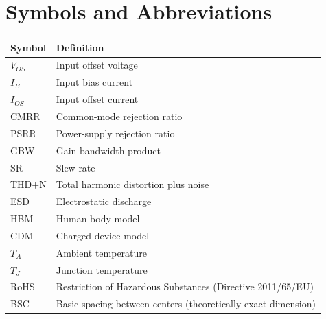 \section{Symbols and Abbreviations}
\begin{center}
\begin{tabular}{@{}L{2.4cm}L{13.0cm}@{}}
\toprule
{}
{\footnotesize\bfseries Symbol} & {\footnotesize\bfseries Definition} \\
\midrule
$V_{OS}$  & Input offset voltage \\
$I_B$     & Input bias current \\
$I_{OS}$  & Input offset current \\
CMRR      & Common-mode rejection ratio \\
PSRR      & Power-supply rejection ratio \\
GBW       & Gain-bandwidth product \\
SR        & Slew rate \\
THD$+$N   & Total harmonic distortion plus noise \\
ESD       & Electrostatic discharge \\
HBM       & Human body model \\
CDM       & Charged device model \\
$T_A$     & Ambient temperature \\
$T_J$     & Junction temperature \\
RoHS      & Restriction of Hazardous Substances (Directive 2011/65/EU) \\
BSC       & Basic spacing between centers (theoretically exact dimension) \\
\bottomrule
\end{tabular}
\end{center}

